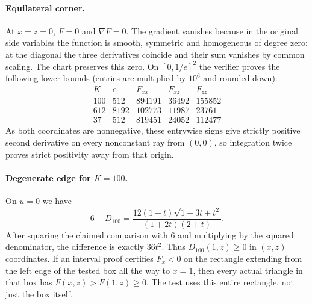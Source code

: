 \documentclass[11pt,a4paper]{article}
\numberwithin{equation}{section}
\theoremstyle{definition}
\theoremstyle{remark}
\begin{document}
\paragraph{Equilateral corner.}
At $x=z=0$, $F=0$ and $\nabla F=0$. The gradient vanishes because in the original side variables the function is smooth, symmetric and homogeneous of degree zero: at the diagonal the three derivatives coincide and their sum vanishes by common scaling. The chart preserves this zero. On $[0,1/e]^2$ the verifier proves the following lower bounds (entries are multiplied by $10^6$ and rounded down):
\[
\begin{array}{r|r|rrr}
K&e&F_{xx}&F_{xz}&F_{zz}\\\hline
100&512&894191&36492&155852\\
612&8192&102773&11987&23761\\
37&512&819451&24052&112477
\end{array}
\]
As both coordinates are nonnegative, these entrywise signs give strictly positive second derivative on every nonconstant ray from $(0,0)$, so integration twice proves strict positivity away from that origin.

\paragraph{Degenerate edge for $K=100$.}
On $u=0$ we have
\[
 6-D_{100}=\frac{12(1+t)\sqrt{1+3t+t^2}}{(1+2t)(2+t)}.
\]
After squaring the claimed comparison with $6$ and multiplying by the squared denominator, the difference is exactly $36t^2$. Thus $D_{100}(1,z)\ge0$ in $(x,z)$ coordinates. If an interval proof certifies $F_x<0$ on the rectangle extending from the left edge of the tested box all the way to $x=1$, then every actual triangle in that box has $F(x,z)>F(1,z)\ge0$. The test uses this entire rectangle, not just the box itself.
\end{document}

